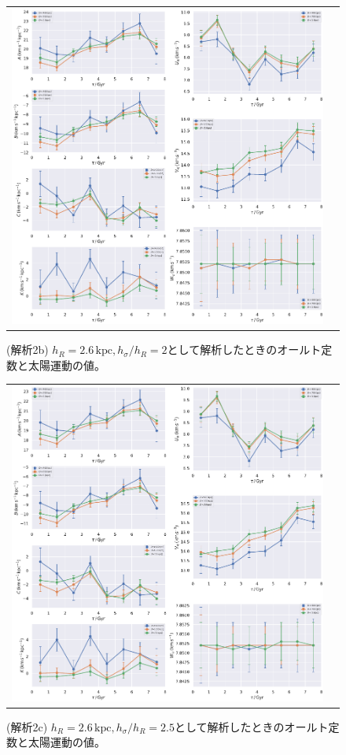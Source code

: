 \begin{figure}
   \centering
\begin{tabular}{cc}
\includegraphics[width=16cm]{fig/2b.pdf}
\end{tabular}
    \caption{(解析2b) $h_R=2.6\,\mathrm{kpc}, h_{\sigma}/h_R=2$として解析したときのオールト定数と太陽運動の値。}
    \label{figObs2b}
\end{figure}

\begin{figure}
   \centering
\begin{tabular}{cc}
\includegraphics[width=16cm]{fig/2c.pdf}
\end{tabular}
    \caption{(解析2c) $h_R=2.6\,\mathrm{kpc}, h_{\sigma}/h_R=2.5$として解析したときのオールト定数と太陽運動の値。}
    \label{figObs2c}
\end{figure}

